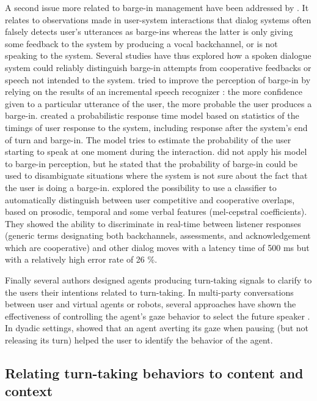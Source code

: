 A second issue more related to barge-in management
have been addressed by \citep{selfridge_continuously_2013}. It relates to observations
made in user-system interactions that dialog systems
often falsely detects user's utterances as barge-ins whereas
the latter is only giving some feedback to the system by
producing a vocal backchannel, or is not speaking to the
system. Several studies have thus explored how a spoken
dialogue system could reliably distinguish barge-in
attempts from cooperative feedbacks or speech not intended
to the system. \citep{selfridge_continuously_2013} tried to improve the perception of barge-in by relying on the results of an incremental speech recognizer : the more confidence given to a particular utterance of the user, the more probable the user produces a barge-in.
\citep{witt_modeling_2014} created a probabilistic response time model based
on statistics of the timings of user response to the system,
including response after the system's end of turn
and barge-in. The model tries to estimate the probability
of the user starting to speak at one moment during
the interaction. \citep{witt_modeling_2014} did not apply his model to barge-in
perception, but he stated that the probability of barge-in
could be used to disambiguate situations where the
system is not sure about the fact that the user is doing a
barge-in. \citep{reidsma_continuous_2011} explored the possibility to use a classifier
to automatically distinguish between user competitive
and cooperative overlaps, based on prosodic, temporal
and some verbal features (mel-cepstral coefficients).
They showed the ability to discriminate in real-time
between listener responses (generic terms designating
both backchannels, assessments, and acknowledgement
which are cooperative) and other dialog moves with a
latency time of 500 ms but with a relatively high error
rate of 26 \%.

Finally several authors designed agents producing turn-taking signals to clarify to the users their intentions related to turn-taking. In multi-party conversations between user and virtual agents or robots, several approaches have shown the effectiveness of controlling the agent's gaze behavior to select the future speaker \citep{mutlu_sotrytelling_2006,bohus_facilitating_2010,al_moubayed_regulating_2015}. In dyadic settings, \citep{skantze_turn-taking_2014} showed that an agent averting its gaze when pausing (but not releasing its turn) helped the user to identify the behavior of the agent.

\subsection{Relating turn-taking behaviors to content and context}

